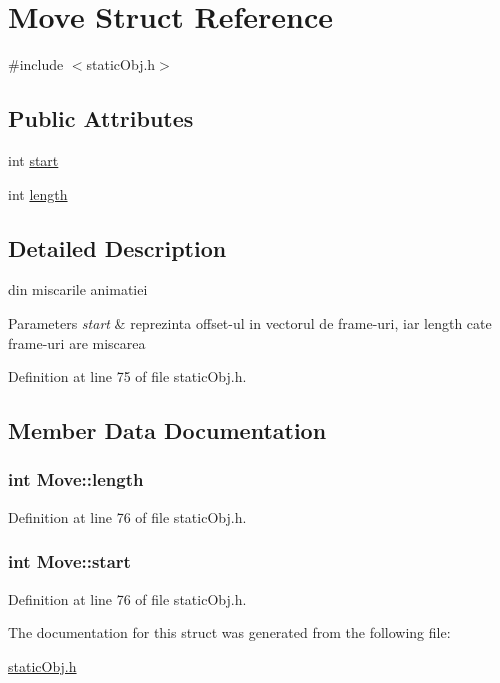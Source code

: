 \hypertarget{struct_move}{\section{Move Struct Reference}
\label{struct_move}
}


{\ttfamily \#include $<$static\-Obj.\-h$>$}

\subsection*{Public Attributes}
\begin{DoxyCompactItemize}
\item 
int \hyperlink{struct_move_a2e80ecb75dadd8a07adac3180805b122}{start}
\item 
int \hyperlink{struct_move_ab71b6eff5c90aa7fb96fc4509fd5e9b4}{length}
\end{DoxyCompactItemize}


\subsection{Detailed Description}
din miscarile animatiei 
\begin{DoxyParams}{Parameters}
{\em start} & reprezinta offset-\/ul in vectorul de frame-\/uri, iar length cate frame-\/uri are miscarea \\
\hline
\end{DoxyParams}


Definition at line 75 of file static\-Obj.\-h.



\subsection{Member Data Documentation}
\hypertarget{struct_move_ab71b6eff5c90aa7fb96fc4509fd5e9b4}{
\subsubsection[{length}]{\setlength{\rightskip}{0pt plus 5cm}int Move\-::length}}\label{struct_move_ab71b6eff5c90aa7fb96fc4509fd5e9b4}


Definition at line 76 of file static\-Obj.\-h.

\hypertarget{struct_move_a2e80ecb75dadd8a07adac3180805b122}{
\subsubsection[{start}]{\setlength{\rightskip}{0pt plus 5cm}int Move\-::start}}\label{struct_move_a2e80ecb75dadd8a07adac3180805b122}


Definition at line 76 of file static\-Obj.\-h.



The documentation for this struct was generated from the following file\-:\begin{DoxyCompactItemize}
\item 
\hyperlink{static_obj_8h}{static\-Obj.\-h}\end{DoxyCompactItemize}
